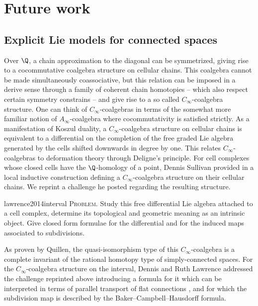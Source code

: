 
\section{Future work} \label{s:future}

\subsection{Explicit Lie models for connected spaces} \label{ss:lie models}

Over $\Q$, a chain approximation to the diagonal can be symmetrized, giving rise to a cocommutative coalgebra structure on cellular chains.
This coalgebra cannot be made simultaneously coassociative, but this relation can be imposed in a derive sense through a family of coherent chain homotopies -- which also respect certain symmetry constrains -- and give rise to a so called $C_\infty$-coalgebra structure.
One can think of $C_\infty$-coalgebras in terms of the somewhat more familiar notion of $A_\infty$-coalgebra where cocommutativity is satisfied strictly.
As a manifestation of Koszul duality, a $C_\infty$-coalgebra structure on cellular chains is equivalent to a differential on the completion of the free graded Lie algebra generated by the cells shifted downwards in degree by one.
This relates $C_\infty$-coalgebras to deformation theory through Deligne's principle.
For cell complexes whose closed cells have the $\Q$-homology of a point, Dennis Sullivan provided in \cite{sullivan2007appendix} a local inductive construction defining a $C_\infty$-coalgebra structure on their cellular chains.
We reprint a challenge he posted regarding the resulting structure.
\begin{displaycquote}[p.2]{lawrence2014interval}
	\textsc{Problem}. Study this free differential Lie algebra attached to a cell complex, determine its topological and geometric meaning as an intrinsic object.
	Give closed form formulae for the differential and for the induced maps associated to subdivisions.
\end{displaycquote}
As proven by Quillen, the quasi-isomorphism type of this $C_\infty$-coalgebra is a complete invariant of the rational homotopy type of simply-connected spaces.
For the $C_\infty$-coalgebra structure on the interval, Dennis and Ruth Lawrence addressed the challenge reprinted above introducing a formula for it which can be interpreted in terms of parallel transport of flat connections \cite{lawrence2014interval}, and for which the subdivision map is described by the Baker--Campbell--Hausdorff formula.

